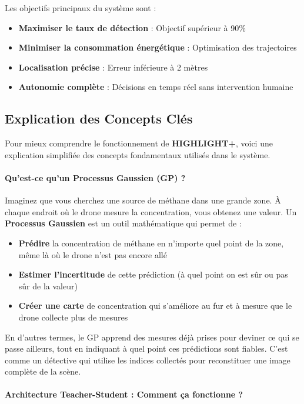 \documentclass[12pt,a4paper]{article}
\newcommand{\highlight}{\textbf{HIGHLIGHT+}}
\newcommand{\gp}{\textsc{GP}}
\begin{document}
Les objectifs principaux du système sont :

\begin{itemize}
    \item \textbf{Maximiser le taux de détection} : Objectif supérieur à 90\%
    \item \textbf{Minimiser la consommation énergétique} : Optimisation des trajectoires
    \item \textbf{Localisation précise} : Erreur inférieure à 2 mètres
    \item \textbf{Autonomie complète} : Décisions en temps réel sans intervention humaine
\end{itemize}

\subsection{Explication des Concepts Clés}

Pour mieux comprendre le fonctionnement de \highlight{}, voici une explication simplifiée des concepts fondamentaux utilisés dans le système.

\paragraph{Qu'est-ce qu'un Processus Gaussien (\gp{}) ?}

Imaginez que vous cherchez une source de méthane dans une grande zone. À chaque endroit où le drone mesure la concentration, vous obtenez une valeur. Un \textbf{Processus Gaussien} est un outil mathématique qui permet de :
\begin{itemize}
    \item \textbf{Prédire} la concentration de méthane en n'importe quel point de la zone, même là où le drone n'est pas encore allé
    \item \textbf{Estimer l'incertitude} de cette prédiction (à quel point on est sûr ou pas sûr de la valeur)
    \item \textbf{Créer une carte} de concentration qui s'améliore au fur et à mesure que le drone collecte plus de mesures
\end{itemize}

En d'autres termes, le \gp{} apprend des mesures déjà prises pour deviner ce qui se passe ailleurs, tout en indiquant à quel point ces prédictions sont fiables. C'est comme un détective qui utilise les indices collectés pour reconstituer une image complète de la scène.

\paragraph{Architecture Teacher-Student : Comment ça fonctionne ?}
\end{document}
